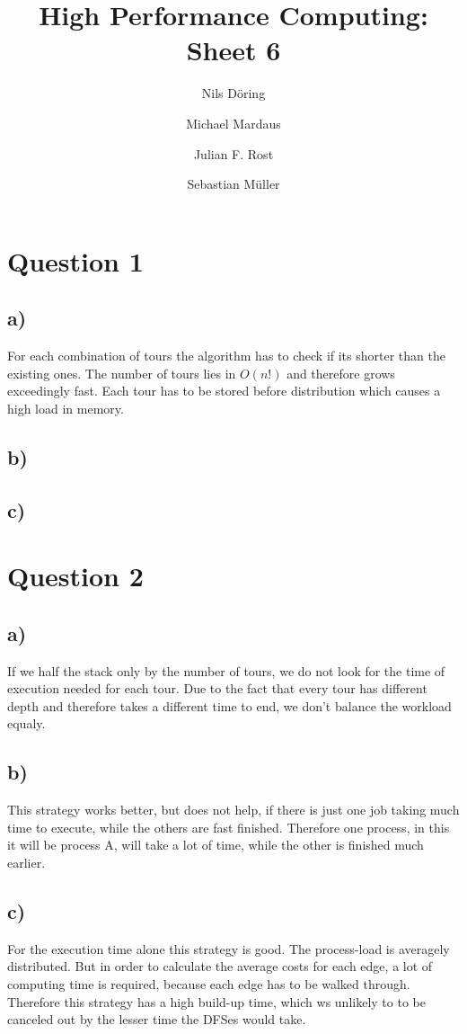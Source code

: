 \documentclass[10pt,a4paper]{scrartcl}
\author{Nils Döring \and Michael Mardaus \and Julian F. Rost \and Sebastian Müller}
\title{High Performance Computing: Sheet 6}
\begin{document}
\maketitle


\section{Question 1}

\subsection{a)}

        For each combination of tours the algorithm has to check if its shorter
        than the existing ones. The number of tours lies in $O(n!)$ and
        therefore grows exceedingly fast. Each tour has to be stored before
        distribution which causes a high load in memory.

\subsection{b)}

\subsection{c)}


\section{Question 2}

\subsection{a)}

        If we half the stack only by the number of tours, we do not look for the
        time of execution needed for each tour. Due to the fact that every tour
        has different depth and therefore takes a different time to end, we
        don't balance the workload equaly.

\subsection{b)}

        This strategy works better, but does not help, if there is just one job
        taking much time to execute, while the others are fast finished.
        Therefore one process, in this it will be process A, will take a lot of
        time, while the other is finished much earlier.

\subsection{c)}

        For the execution time alone this strategy is good. The process-load is
        averagely distributed. But in order to calculate the average costs for
        each edge, a lot of computing time is required, because each edge has to
        be walked through. Therefore this strategy has a high build-up time,
        which ws unlikely to to be canceled out by the lesser time the DFSes
        would take.
\end{document}
